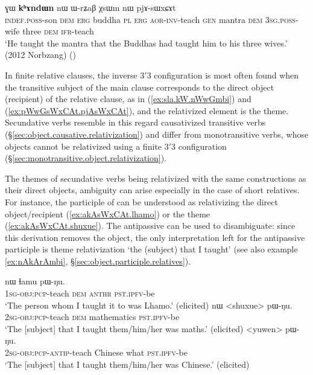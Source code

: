  
\begin{exe}
\ex \label{ex:pWwGsWxCAt.pjAsWxCAt}
 ɣɯ \textbf{kʰɤndɯn} nɯ ɯ-rʑaβ χsɯm nɯ pjɤ-sɯxɕɤt \\
\textsc{indef}.\textsc{poss}-son \textsc{dem} \textsc{erg} buddha \textsc{pl} \textsc{erg} \textsc{aor}-\textsc{inv}-teach \textsc{gen} mantra \textsc{dem} \textsc{3sg}.\textsc{poss}-wife three \textsc{dem} \textsc{ifr}-teach \\
\glt `He taught the mantra that the Buddhas had taught him to his three wives.' (2012 Norbzang)
()
\end{exe} 

In finite relative clauses, the inverse 3$'$\fl{}3 configuration is most often found when the transitive subject of the main clause corresponds to the direct object (recipient) of the relative clause, as in (\ref{ex:sla.kW.nWwGmbi}) and (\ref{ex:pWwGsWxCAt.pjAsWxCAt}), and the relativized element is the theme. Secundative verbs resemble in this regard causativized transitive verbs (§\ref{sec:object.causative.relativization}) and differ from monotransitive verbs, whose objects cannot be relativized using a finite  3$'$\fl{}3 configuration (§\ref{sec:monotransitive.object.relativization}).

The themes of secundative verbs being relativized with the same constructions as their direct objects, ambiguity can arise especially in the case of short relatives. For instance, the participle  of  can be understood as relativizing the direct object/recipient (\ref{ex:akAsWxCAt.lhamo}) or the theme (\ref{ex:akAsWxCAt.shuxue}). The antipassive can be used to disambiguate: since this derivation removes the object, the only interpretation left for the antipassive participle  is theme relativization `the (subject) that I taught' (see also example \ref{ex:nAkArAmbi}, §\ref{sec:object.participle.relatives}).

\begin{exe}
\ex 
\begin{xlist}
\ex \label{ex:akAsWxCAt.lhamo}
\gll  [a-kɤ-sɯxɕɤt] nɯ ɬamu pɯ-ŋu. \\
\textsc{1sg}-\textsc{obj}:\textsc{pcp}-teach \textsc{dem}  \textsc{anthr} \textsc{pst}.\textsc{ipfv}-be \\
\glt `The person whom I taught it to was Lhamo.' (elicited)
\ex \label{ex:akAsWxCAt.shuxue}
\gll  [a-kɤ-sɯxɕɤt] nɯ  <shuxue> pɯ-ŋu. \\
\textsc{2sg}-\textsc{obj}:\textsc{pcp}-teach \textsc{dem} mathematics \textsc{pst}.\textsc{ipfv}-be \\
\glt `The [subject] that I taught them/him/her was maths.' (elicited)
\ex \label{ex:akAsAsWxCAt}
\gll [a-kɤ-sɤ-sɯxɕɤt] <yuwen>  pɯ-ŋu. \\
\textsc{2sg}-\textsc{obj}:\textsc{pcp}-\textsc{antip}-teach Chinese what \textsc{pst}.\textsc{ipfv}-be \\
\glt `The [subject] that I taught them/him/her was Chinese.' (elicited)
\end{xlist} 
\end{exe} 

